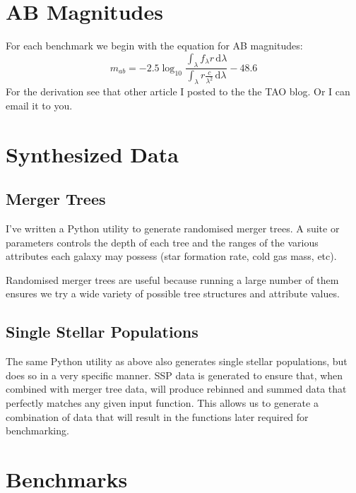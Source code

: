 \documentclass[12pt]{scrartcl}
\newcommand{\dx}[1]{\ensuremath{\,\mathrm{d}#1}}
\begin{document}
\maketitle

\section{AB Magnitudes}

For each benchmark we begin with the equation for AB magnitudes:
\[ m_{ab} = -2.5\log_{10} \frac{{\displaystyle \int_\lambda f_\lambda
    r \dx{\lambda}}}{{\displaystyle \int_\lambda r \frac{c}{\lambda^2}
    \dx{\lambda}}} - 48.6 \]
For the derivation see that other article I posted to the the TAO
blog. Or I can email it to you.

\section{Synthesized Data}

\subsection{Merger Trees}

I've written a Python utility to generate randomised merger trees. A
suite or parameters controls the depth of each tree and the ranges of
the various attributes each galaxy may possess (star formation rate,
cold gas mass, etc).

Randomised merger trees are useful because running a large number of
them ensures we try a wide variety of possible tree structures and
attribute values.

\subsection{Single Stellar Populations}

The same Python utility as above also generates single stellar
populations, but does so in a very specific manner. SSP data is
generated to ensure that, when combined with merger tree data, will
produce rebinned and summed data that perfectly matches any given
input function. This allows us to generate a combination of data that
will result in the functions later required for benchmarking.

\section{Benchmarks}
\end{document}
